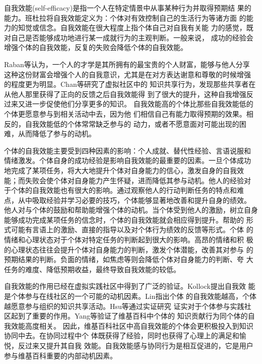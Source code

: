 自我效能(self-efficacy)是指一个人在特定情景中从事某种行为并取得预期结
果的能力。班杜拉将自我效能定义为：个体对有效控制自己的生活行为等诸方面
的能力的知觉或信念\cite{bundura1977slt}。自我效能在很大程度上指个体自己对自我有关能
力的感觉，既对自己是否能够成功地进行某一成就行为的主观判断。一般来说，
成功的经验会增强个体的自我效能，反复的失败会降低个体的自我效能。

Raban等认为，一个人的才学是其所拥有的最宝贵的个人财富，能够与他人分享
这种这份财富会增强个人的自我意识，尤其是在对方表达谢意和尊敬的时候增强
的程度更为明显\cite{raban2007investigating}。Chan等研究了虚拟社区中的
知识共享行为，发现那些共享者在从他人那里获得了正向的反馈之后自我效能得
到了很大的提升，这种自我增强反过来又进一步促使他们分享更多的知识\cite{10.1109/HICSS.2004.1265460}。
自我效能高的个体比那些自我效能低的个体更愿意参与到相关活动中去，因为他
们相信自己有能力取得预期的效果。相反的，自我效能低的个体常常缺乏参与的
动力，或者不愿意面对可能出现的困难，从而降低了参与的动机。

个体的自我效能主要受到四种因素的影响：个人成就、替代性经验、言语说服和
情绪激发。个体自身的成功经验是影响自我效能的最重要的因素。一旦个体成功
地完成了某项任务，将大大地提升个体对自身能力的信心，激发自身的自我效
能；而失败会使个体对自身能力产生怀疑，进而降低其参与动机。他人的经验对
于个体的自我效能也有很大的影响。通过观察他人的行动判断任务的特点和难
点，从中吸取经验并学习必要的技巧，个体能够显著地改善和提升自身的绩效。
他人对与个体的鼓励和帮助能增强个体的动机。当个体受到他人的激励，树立自身
能够成功完成某项任务的信念时，个体的自我效能就会相应得到提升。帮助的
形式可能有言语上的激励、直接的指导以及对个体行为绩效的反馈等形式。个体
的情绪和心理状态对于个体对特定任务的判断起到很大的影响。高昂的情绪和积
极的心理状态往往会提升个体对自身能力的判断，激发个体潜能，改善其对参与
的预期结果的判断。负面的情绪，如焦虑等则会降低个体对自身能力的判断、夸
大任务的难度、降低预期收益，最终导致自我效能的较低。

自我效能的作用已经在虚拟实践社区中得到了广泛的验证。Kollock提出自我效
能是个体参与在线社区的一个可能的动机因素\cite{Smith1999}。Lin指出个体
的自我效能越高，个体越愿意参与组织的知识共享活动\cite{Hsiu-FenLin04012007}。Hsu等通过实证研究
证实对于个体参与实践社区起到了重要的作用。Yang等验证了维基百科中个体的
知识贡献行为同个体的自我效能高度相关\cite{yang2010motivations}。
因此，维基百科社区中高自我效能的个体会更积极投入到知识协同中去。在协同过程中个
体既获得了经验，同时也获得了心理上的满足和愉悦，反过来又提升其自我
效能。自我效能感与协同行为是相互促进的，它是用户参与维基百科重要的内部动机因素。

